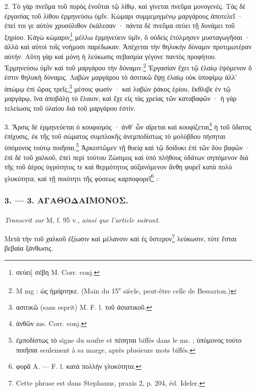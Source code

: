 \documentclass[landscape, a4paper, 11pt, oneside, polutonikogreek, french]{article}
\begin{document}
2. Τὸ γὰρ πνεῦμα τοῦ πυρὸς ἑνοῦται τῷ λίθῳ, καὶ γίνεται πνεῦμα μονογενές. Τὰς δὲ ἐργασίας τοῦ λίθου ἑρμηνεύσω ὑμῖν. Κώμαρι συμμεμιγμένῳ μαργάρους ἀποτελεῖ · ἐπεί τοι γε αὐτὸν χρυσόλιθον ἐκάλεσαν · πάντα δὲ πνεῦμα σεύει τῇ δυνάμει τοῦ ξηρίου. Κἀγὼ κώμαριν\footnote{σεύει] σέβη M. Corr. conj.} μέλλω ἑρμηνεύειν ὑμῖν, ὃ οὐδεὶς ἐτόλμησεν μυσταγωγῆσαι · ἀλλὰ καὶ αὐτοὶ τοῖς νοήμοσι παρέδωκαν. Ἀπέχεται τὴν θηλυκὴν δύναμιν προτιμωτέραν αὐτήν. Αὕτη γὰρ καὶ μόνη ἡ λεύκωσις σεβασμία γέγονε παντὸς προφήτου. Ἑρμηνεύσω ὑμῖν καὶ τοῦ μαργάρου τὴν δύναμιν.\footnote{M mg : ὡς ἡμάρτηκε. (Main du 15\textsuperscript{e} siècle, peut-être celle de Bessarion.)} Ἐργασίαν ἔχει τῷ ἐλαίῳ ἑψόμενον ὅ ἐστιν θηλυκὴ δύναμις. Λαβὼν μαργάρου τὸ ἀσιτικῶ ἕψῃ ἐλαίῳ οὐκ ὑποφίμῳ ἀλλ' ἀπώμῳ ἐπὶ ὥρας τρεῖς,\footnote{ασιτικῶ (sans esprit) M. F. l. τοῦ ἀσιατικοῦ.} μέσοις φωσίν · καὶ λαβὼν ῥάκος ἐρίου, ἔκθλιβε ἐν τῷ μαργάρῳ, ἵνα ἀποβάλῃ τὸ ἔλαιον, καὶ ἔχε εἰς τὰς χρείας τῶν καταβαφῶν · ἡ γὰρ τελείωσις τοῦ ὑλαίου διὰ τοῦ μαργάρου ἐστίν.

3. Ἄρσις δὲ ἑρμηνεύεται ὁ κουφισμός · ἀνθ' ὧν αἴρεται καὶ κουφίζεται\footnote{ἀνθῶν ms. Corr. conj.} ἡ τοῦ ὕδατος ἐπίχυσις, ἐκ τῆς τοῦ σώματος συμπλοκῆς ἀνεμποδίστως τὸ μολύβδου πήσηται ὑπόμονος τούτῳ ποιῆσαι.\footnote{ἐμποδίστως τὸ signe du soufre et πέσηται biffés dans le ms. ; ὑπόμονος τούτο ποιῆσαι seulement à sa marge, après plusieurs mots biffés.} Ἀρκεστῶμεν τῇ θυείᾳ καὶ τῷ δοίδυκι ἐπὶ τῶν δύο βαφῶν · ἐπὶ δὲ τοῦ χαλκοῦ, ἐπεὶ περὶ τούτου Ζώσιμος καὶ ὑπὸ πλήθους ὑδάτων σηπόμενον διὰ τῆς τοῦ ἀέρος ὑγρότητος τε καὶ θερμότητος αὐξανόμενον ἄνθη φορεῖ κατὰ πολὺ γλυκύτητα, καὶ τῇ ποιότητι τῆς φύσεως καρποφορεῖ\footnote{φορᾶ A. --- F. l. κατὰ πολλὴν γλυκύτητα.} :

\bigskip
\centerline{\EightStarTaper}
\centerline{\EightStarTaper\EightStarTaper}
\bigskip

\subsubsection{3. --- 3. ΑΓΑΘΟΔΑΙΜΟΝΟΣ.}
\paragraph{}
\emph{Transcrit sur} M, f. 95 v., \emph{ainsi que l'article suiνant}.

\bigskip

Μετὰ τὴν τοῦ χαλκοῦ ἐξίωσιν καὶ μέλανσιν καὶ ἐς ὕστερον\footnote{Cette phrase est dans Stephanus, praxis 2, p. 204, éd. Ideler.} λεύκωσιν, τότε ἔσται βεβαία ξάνθωσις.
\end{document}

